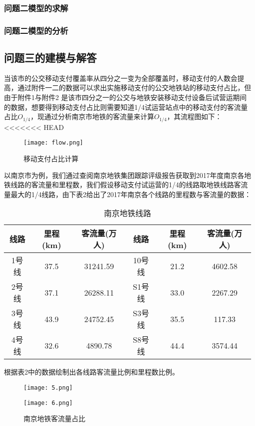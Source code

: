 \documentclass[withoutpreface,bwprint]{cumcmthesis} %
\begin{document}
\subsubsection{问题二模型的求解}
\subsubsection{问题二模型的分析}
\subsection{问题三的建模与解答}
当该市的公交移动支付覆盖率从四分之一变为全部覆盖时，移动支付的人数会提高，通过附件一二的数据可以求出实施移动支付的公交地铁站的移动支付占比，但由于附件1与附件2 是该市四分之一的公交与地铁安装移动支付设备后试营运期间的数据，想要得到移动支付占比则需要知道1/4试运营站点中的移动支付的客流量占比$O_{1/4}$，现通过分析南京市地铁的客流量来计算$O_{1/4}$，其流程图如下：
<<<<<<< HEAD

\begin{figure}[h]
\centering
\texttt{[image: flow.png]}
\caption{移动支付占比计算}
\end{figure}
以南京市为例，我们通过查阅南京地铁集团跟踪评级报告获取到2017年度南京各地铁线路的客流量和里程数，我们假设移动支付试运营的1/4的线路取地铁线路客流量最大的1/4线路，由下表2给出了2017年南京各个线路的里程数与客流量的数据：
\begin{center}
\makeatletter{}\makeatother
\begin{table}[h]
\centering
\caption{南京地铁线路}\label{tab:aStrangeTable}\centering%
\begin{tabular}{c|c|c|c|c|c}\hline
线路&里程(km)&客流量(万人)&线路&里程(km)&客流量(万人)\\\hline
1号线&37.5&31241.59&10号线&21.2&4602.58\\
2号线&37.1&26288.11&S1号线&33.0&2267.29\\
3号线&43.9&24752.45&S3号线&35.5&117.33\\
4号线&32.6&4890.78&S8号线&44.4&3574.44\\\hline
\end{tabular}
\end{table}
\end{center}

根据表2中的数据绘制出各线路客流量比例和里程数比例。
\begin{figure}[h]
\centering
\begin{minipage}[c]{0.4\textwidth}
\centering
\texttt{[image: 5.png]}
\end{minipage}
\begin{minipage}[c]{0.4\textwidth}
\centering
\texttt{[image: 6.png]}
\end{minipage}
\caption{南京地铁客流量占比}
\end{figure}
\end{document}

